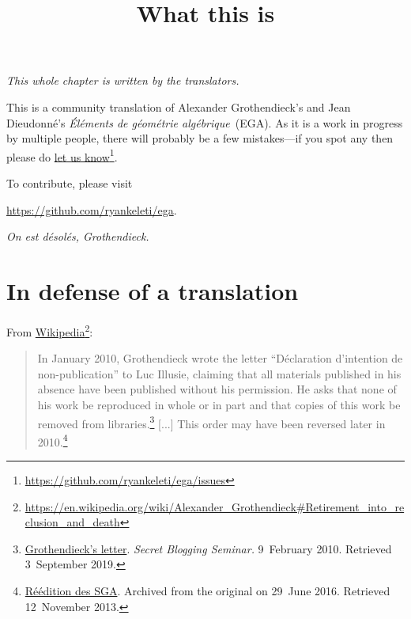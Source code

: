 


\title{What this is}
\maketitle

\label{section:what}

\noindent
\emph{This whole chapter is written by the translators.}

\bigskip

\noindent
This is a community translation of Alexander Grothendieck's and Jean Dieudonn\'e's \emph{\'El\'ements de g\'eom\'etrie alg\'ebrique}~(EGA).
As it is a work in progress by multiple people, there will probably be a few mistakes---if you spot any then please do \href{https://github.com/ryankeleti/ega/issues}{let us know}\footnote{\url{https://github.com/ryankeleti/ega/issues}}.

\noindent
To contribute, please visit
\begin{center}
  \url{https://github.com/ryankeleti/ega}.
\end{center}

\noindent
\emph{On est d\'esol\'es, Grothendieck.}

\section*{In defense of a translation}

From \href{https://en.wikipedia.org/wiki/Alexander_Grothendieck\#Retirement_into_reclusion_and_death}{Wikipedia}\footnote{\url{https://en.wikipedia.org/wiki/Alexander_Grothendieck\#Retirement_into_reclusion_and_death}}:

\begin{quote}
In January 2010, Grothendieck wrote the letter ``D\'eclaration d'intention de non-publication'' to Luc Illusie, claiming that all materials published in his absence have been published without his permission.
He asks that none of his work be reproduced in whole or in part and that copies of this work be removed from libraries.\footnote{\href{https://sbseminar.wordpress.com/2010/02/09/grothendiecks-letter/}{Grothendieck's letter}. \emph{Secret Blogging Seminar.} 9~February 2010. Retrieved 3~September 2019.}
[...]
This order may have been reversed later in 2010.\footnote{\href{https://web.archive.org/web/20160629235119/http://www.math.u-psud.fr/~laszlo/sga4.html}{R\'e\'edition des SGA}. Archived from the original on 29~June 2016. Retrieved 12~November 2013.}
\end{quote}

